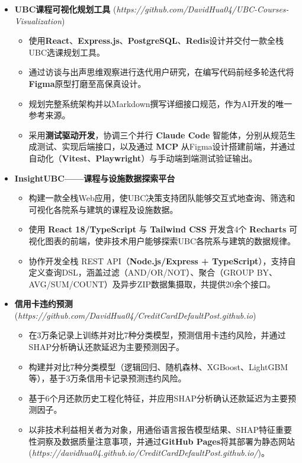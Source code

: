 \documentclass{resume}
\begin{document}
\begin{itemize}[parsep=0.2ex]
  \item \textbf{UBC课程可视化规划工具} (\textit{https://github.com/DavidHua04/UBC-Courses-Visualization})
  \begin{itemize}
    \item 使用\textbf{React}、\textbf{Express.js}、\textbf{PostgreSQL}、\textbf{Redis}设计并交付一款全栈UBC选课规划工具。
    \item 通过访谈与出声思维观察进行迭代用户研究，在编写代码前经多轮迭代将\textbf{Figma}原型打磨至高保真设计。
    \item 规划完整系统架构并以Markdown撰写详细接口规范，作为AI开发的唯一参考来源。
    \item 采用\textbf{测试驱动开发}，协调三个并行 \textbf{Claude Code} 智能体，分别从规范生成测试、实现后端接口，以及通过 \textbf{MCP} 从Figma设计搭建前端，并通过自动化（\textbf{Vitest}、\textbf{Playwright}）与手动端到端测试验证输出。
  \end{itemize}
  \item \textbf{InsightUBC——课程与设施数据探索平台}
  \begin{itemize}
    \item 构建一款全栈Web应用，使UBC决策支持团队能够交互式地查询、筛选和可视化各院系与建筑的课程及设施数据。
    \item 使用 \textbf{React 18/TypeScript} 与 \textbf{Tailwind CSS} 开发含4个 \textbf{Recharts} 可视化图表的前端，使非技术用户能够探索UBC各院系与建筑的数据规律。
    \item 协作开发全栈 REST API（\textbf{Node.js/Express + TypeScript}），支持自定义查询DSL，涵盖过滤（AND/OR/NOT）、聚合（GROUP BY、AVG/SUM/COUNT）及异步ZIP数据集摄取，共提供20余个接口。
  \end{itemize}
  \item \textbf{信用卡违约预测} (\textit{https://github.com/DavidHua04/CreditCardDefaultPost.github.io})
  \begin{itemize}
    \item 在3万条记录上训练并对比7种分类模型，预测信用卡违约风险，并通过SHAP分析确认还款延迟为主要预测因子。
    \item 构建并对比7种分类模型（逻辑回归、随机森林、XGBoost、LightGBM等），基于3万条信用卡记录预测违约风险。
    \item 基于6个月还款历史工程化特征，并应用SHAP分析确认还款延迟为主要预测因子。
    \item 以非技术利益相关者为对象，用通俗语言报告模型结果、SHAP特征重要性洞察及数据质量注意事项，并通过\textbf{GitHub Pages}将其部署为静态网站 (\textit{https://davidhua04.github.io/CreditCardDefaultPost.github.io/})。
  \end{itemize}
\end{itemize}
\end{document}
